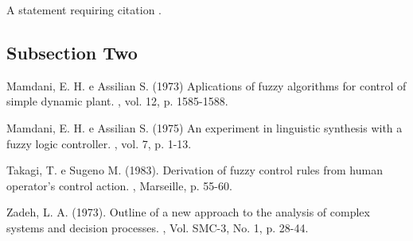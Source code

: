 \documentclass[
	twoside,				%
	twocolumn,				%
	english,				%
	brazil,					%
]{article}
\begin{document}
A statement requiring citation \cite{Figueredo:2009dg}.

\subsection{Subsection Two}


\begin{thebibliography}{99} %

Mamdani, E. H. e Assilian S. (1973)
\newblock Aplications of fuzzy algorithms for control of simple dynamic plant.
, vol. 12, p. 1585-1588.

Mamdani, E. H. e Assilian S. (1975)
\newblock An experiment in linguistic synthesis with a fuzzy logic controller.
, vol. 7, p. 1-13.

Takagi, T. e Sugeno M. (1983).
\newblock Derivation of fuzzy control rules from human operator’s control action.
, Marseille, p. 55-60.

Zadeh, L. A. (1973).
\newblock Outline of a new approach to the analysis of complex systems and decision processes.
, Vol. SMC-3, No. 1, p. 28-44.

\end{thebibliography}

\end{document}
